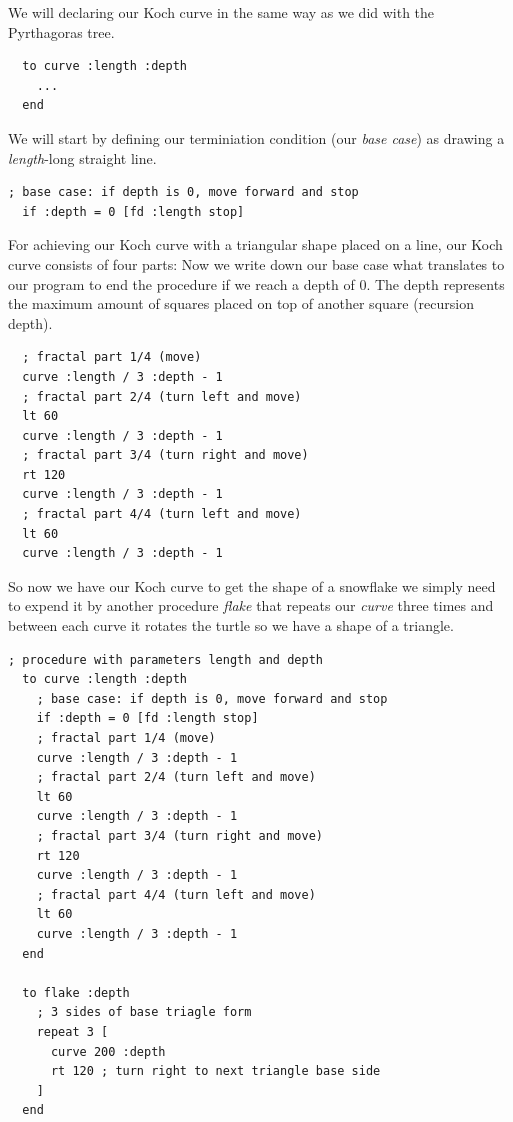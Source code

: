 \documentclass[a4paper, 11pt]{article}
\begin{document}
We will declaring our Koch curve in the same way as we did with the Pyrthagoras tree.

\begin{lstlisting}
  to curve :length :depth
    ...
  end
\end{lstlisting}

We will start by defining our terminiation condition (our \textit{base case}) as drawing a \textit{length}-long straight line.

\begin{lstlisting}[title=Part 1/4:]
  ; base case: if depth is 0, move forward and stop
  if :depth = 0 [fd :length stop]
\end{lstlisting}

For achieving our Koch curve with a triangular shape placed on a line, our Koch curve consists of four parts:
Now we write down our base case what translates to our program to end the procedure if we reach a depth of 0. The depth represents the maximum amount of squares placed on top of another square (recursion depth).

\begin{lstlisting}
  ; fractal part 1/4 (move)
  curve :length / 3 :depth - 1
  ; fractal part 2/4 (turn left and move)
  lt 60
  curve :length / 3 :depth - 1
  ; fractal part 3/4 (turn right and move)
  rt 120
  curve :length / 3 :depth - 1
  ; fractal part 4/4 (turn left and move)
  lt 60
  curve :length / 3 :depth - 1
\end{lstlisting}

So now we have our Koch curve to get the shape of a snowflake we simply need to expend it by another procedure \textit{flake} 
that repeats our \textit{curve} three times and between each curve it rotates the turtle so we have a shape of a triangle.

\begin{lstlisting}[title={Kock flake}]
  ; procedure with parameters length and depth
  to curve :length :depth
    ; base case: if depth is 0, move forward and stop
    if :depth = 0 [fd :length stop]
    ; fractal part 1/4 (move)
    curve :length / 3 :depth - 1
    ; fractal part 2/4 (turn left and move)
    lt 60
    curve :length / 3 :depth - 1
    ; fractal part 3/4 (turn right and move)
    rt 120
    curve :length / 3 :depth - 1
    ; fractal part 4/4 (turn left and move)
    lt 60
    curve :length / 3 :depth - 1
  end

  to flake :depth
    ; 3 sides of base triagle form
    repeat 3 [
      curve 200 :depth
      rt 120 ; turn right to next triangle base side
    ]
  end
\end{lstlisting}
\end{document}
